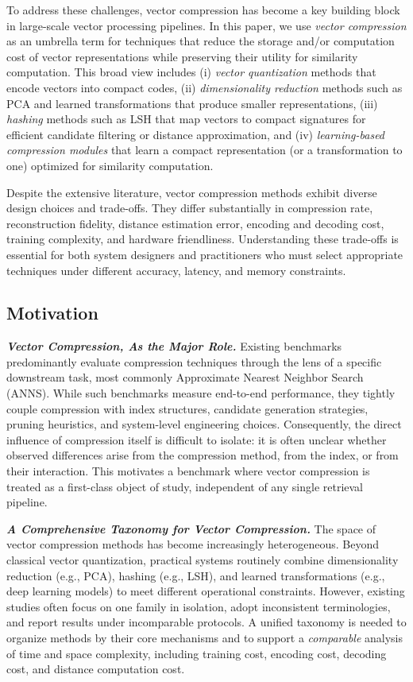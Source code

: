 \documentclass[sigconf]{acmart}
\begin{document}
To address these challenges, vector compression has become a key building block in large-scale vector processing pipelines. In this paper, we use \emph{vector compression} as an umbrella term for techniques that reduce the storage and/or computation cost of vector representations while preserving their utility for similarity computation.
This broad view includes (i) \emph{vector quantization} methods that encode vectors into compact codes, (ii) \emph{dimensionality reduction} methods such as PCA and learned transformations that produce smaller representations, (iii)
\emph{hashing} methods such as LSH that map vectors to compact signatures for efficient candidate filtering or distance approximation, and (iv) \emph{learning-based compression modules} that learn a compact representation (or a
transformation to one) optimized for similarity computation.

Despite the extensive literature, vector compression methods exhibit diverse design choices and trade-offs.
They differ substantially in compression rate, reconstruction fidelity, distance estimation error, encoding and decoding cost, training complexity, and hardware friendliness. 
Understanding these trade-offs is essential for both system designers and practitioners who must select appropriate techniques under different accuracy, latency, and memory constraints.

\subsection{Motivation}

\textbf{\emph{Vector Compression, As the Major Role.}}
Existing benchmarks predominantly evaluate compression techniques through the lens of a specific downstream task, most commonly Approximate Nearest Neighbor Search (ANNS). 
While such benchmarks measure end-to-end performance, they tightly couple compression with index structures, candidate generation strategies, pruning heuristics, and system-level engineering choices.
Consequently, the direct influence of compression itself is difficult to isolate: it is often unclear whether observed differences arise from the compression method, from the index, or from their interaction. 
This motivates a benchmark where vector compression is treated as a first-class object of study, independent of any single retrieval pipeline.

\textbf{\emph{A Comprehensive Taxonomy for Vector Compression.}}
The space of vector compression methods has become increasingly heterogeneous. Beyond classical vector quantization, practical systems routinely combine dimensionality reduction (e.g., PCA), hashing
(e.g., LSH), and learned transformations (e.g., deep learning models) to meet different operational constraints. 
However, existing studies often focus on one family in isolation, adopt inconsistent terminologies, and report results under incomparable protocols.
A unified taxonomy is needed to organize methods by their core mechanisms and to support a \emph{comparable} analysis of time and space complexity, including training cost, encoding cost, decoding cost, and distance computation cost.
\end{document}
